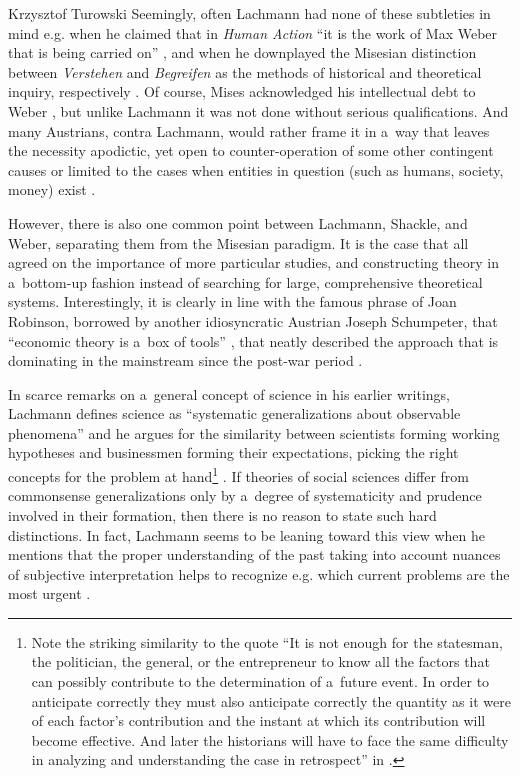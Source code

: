 \begin{artengenv}{Krzysztof Turowski}
Seemingly, often Lachmann had none of these subtleties in mind e.g. when he claimed that in \emph{Human Action} ``it is the work of Max Weber that is being carried on'' \parencite[95]{lachmann-ha}, and when he downplayed the Misesian distinction between \emph{Verstehen} and \emph{Begreifen} as the methods of historical and theoretical inquiry, respectively \parencite[49]{lachmann-significance}.
Of course, Mises acknowledged his intellectual debt to Weber \parencite[79]{mises-epe}, but unlike Lachmann it was not done without serious qualifications.
And many Austrians, contra Lachmann, would rather frame it in a~way that leaves the necessity apodictic, yet open to counter-operation of some other contingent causes or limited to the cases when entities in question (such as humans, society, money) exist \parencite[57]{rothbard-present}.

However, there is also one common point between Lachmann, Shackle, and Weber, separating them from the Misesian paradigm.
It is the case that all agreed on the importance of more particular studies, and constructing theory in a~bottom-up fashion instead of searching for large, comprehensive theoretical systems.
Interestingly, it is clearly in line with the famous phrase of Joan Robinson, borrowed by another idiosyncratic Austrian Joseph Schumpeter, that ``economic theory is a~box of tools'' \parencite[15]{schumpeter-history}, that neatly described the approach that is dominating in the mainstream since the post-war period \parencite{morgan,rodrik}.

In scarce remarks on a~general concept of science in his earlier writings, Lachmann defines science as ``systematic generalizations about observable
phenomena'' \parencite[166]{lachmann-science} and he argues for the similarity between scientists forming working hypotheses and businessmen forming their expectations, picking the right concepts for the problem at hand\footnote{Note the striking similarity to the quote ``It is not enough for the statesman, the politician, the general, or the entrepreneur to know all the factors that can possibly contribute to the determination of a~future event. In order to anticipate correctly they must also anticipate correctly the quantity as it were of each factor's contribution and the instant at which its contribution will become effective. And later the historians will have to face the same difficulty in analyzing and understanding the case in retrospect'' in \textcite[314--315]{mises-theory}.} \cite[90, 93]{lachmann-shackle-time}. If theories of social sciences differ from commonsense generalizations only by a~degree of systematicity and prudence involved in their formation, then there is no reason to state such hard distinctions.
In fact, Lachmann seems to be leaning toward this view when he mentions that the proper understanding of the past taking into account nuances of subjective interpretation helps to recognize e.g. which current problems are the most urgent \parencite[240]{lachmann-hermeneutic}.


\end{artengenv}
